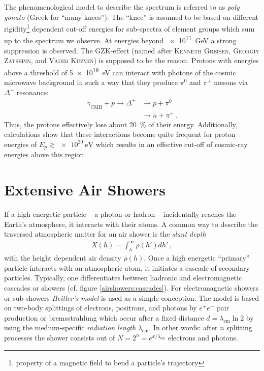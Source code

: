 The phenomenological model to describe the spectrum is referred to as \textit{poly gonato} (Greek for \enquote{many knees}). The \enquote{knee} is assumed to be based on different rigidity\footnote{property of a magnetic field to bend a particle's trajectory} dependent cut-off energies for sub-spectra of element groups which sum up to the spectrum we observe. \cite{cosmicrays:hoerandel, cosmicrays:shapiro} At energies beyond \SI{e11}{\giga\electronvolt} a strong suppression is observed. The GZK-effect (named after \textsc{Kenneth Greisen}, \textsc{Georgiy Zatsepin}, and \textsc{Vadim Kuzmin}) is supposed to be the reason. Protons with energies above a threshold of \SI{5e19}{\electronvolt} can interact with photons of the cosmic microwave background in such a way that they produce $\pi^0$ and $\pi^+$ mesons via $\Delta^+$ resonance:
\begin{subequations}
	\begin{align}
	\gamma_\text{CMB} + p \rightarrow \Delta^+ &\rightarrow p + \pi^0\\
	&\rightarrow n + \pi^+\,.
	\end{align}
\end{subequations}
Thus, the protons effectively lose about \SI{20}{\percent} of their energy. Additionally, calculations show that these interactions become quite frequent for proton energies of $E_p\gtrsim\SI{e20}{\electronvolt}$ which results in an effective cut-off of cosmic-ray energies above this region. \cite{cosmicrays:gzk}

\section{Extensive Air Showers}

If a high energetic particle -- a photon or hadron -- incidentally reaches the Earth's atmosphere, it interacts with their atoms. A common way to describe the traversed atmospheric matter for an air shower is the \textit{slant depth}
\begin{align}
X(h) = \int_{h}^{\infty}\rho(h')dh'\,,
\end{align}
with the height dependent air density $\rho(h)$. Once a high energetic \enquote{primary} particle interacts with an atmospheric atom, it initiates a cascade of secondary particles. Typically, one differentiates between hadronic and electromagnetic cascades or showers (cf. figure \ref{airshowers:cascades}). For electromagnetic showers or sub-showers \textit{Heitler's model} is used as a simple conception. The model is based on two-body splittings of electrons, positrons, and photons by $e^+ e^-$ pair production or bremsstrahlung which occur after a fixed distance $d=\lambda_\text{em}\ln{2}$ by using the medium-specific \textit{radiation length} $\lambda_\text{em}$. In other words: after $n$ splitting processes the shower consists out of $N = 2^n = e^{x/\lambda_\text{em}}$ electrons and photons.

